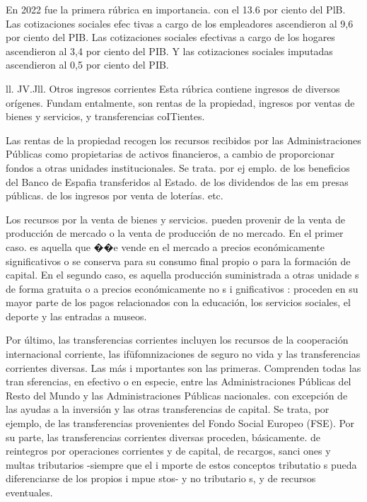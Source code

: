 \documentclass[10pt,a4paper]{article}
\begin{document}
En 2022 fue la primera rúbrica en importancia. con el 13.6 por ciento del PlB. Las cotizaciones sociales efec tivas a cargo de los empleadores ascendieron al 9,6 por ciento del PIB. Las cotizaciones sociales efectivas a cargo de los hogares ascendieron al 3,4 por ciento del PIB. Y las cotizaciones sociales imputadas ascendieron al 0,5 por ciento del PIB.

ll. JV.Jll. Otros ingresos corrientes
Esta rúbrica contiene ingresos de diversos orígenes. Fundam entalmente, son rentas de la propiedad, ingresos por ventas de bienes y servicios, y transferencias coITientes. 

Las rentas de la propiedad recogen los recursos recibidos por las Administraciones Públicas como propietarias de activos financieros, a cambio de proporcionar fondos a otras unidades institucionales. Se trata. por ej emplo. de los beneficios del Banco de Espafia transferidos al Estado. de los dividendos de las em presas públicas. de los ingresos por venta de loterías. etc. 

Los recursos por la venta de bienes y servicios. pueden provenir de la venta de producción de mercado o la venta de producción de no mercado. En el primer caso. es aquella que ��e vende en el mercado a precios económicamente significativos o se conserva para su consumo final propio o para la formación de capital. En el segundo caso, es aquella producción suministrada a otras unidade s de forma gratuita o a precios económicamente no s i gnificativos : proceden en su mayor parte de los pagos relacionados con la educación, los servicios sociales, el deporte y las entradas a museos.

Por último, las transferencias corrientes incluyen los recursos de la cooperación internacional corriente, las ifüfomnizaciones de seguro no vida y las transferencias corrientes diversas. Las más i mportantes son las primeras. Comprenden todas las tran sferencias, en efectivo o en especie, entre las Administraciones Públicas del Resto del Mundo y las Administraciones Públicas nacionales. con excepción de las ayudas a la inversión y las otras transferencias de capital. Se trata, por ejemplo, de las transferencias provenientes del Fondo Social Europeo (FSE). Por su parte, las transferencias corrientes diversas proceden, básicamente. de reintegros por operaciones corrientes y de capital, de recargos, sanci ones y multas tributarios -siempre que el i mporte de estos conceptos tributatio s pueda diferenciarse de los propios i mpue stos- y no tributario s, y de recursos eventuales.
\end{document}
